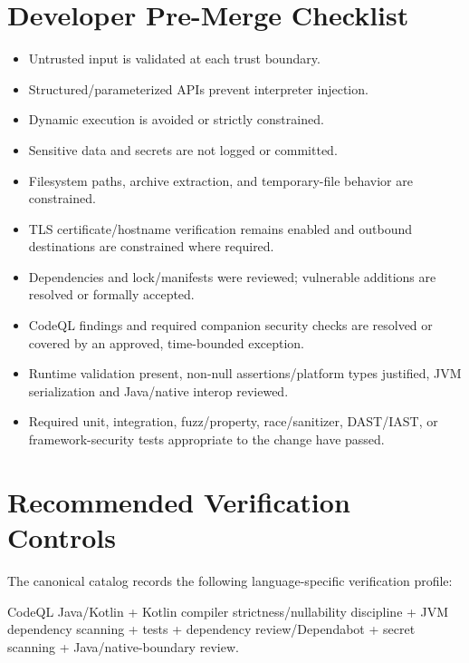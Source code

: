 \documentclass[10pt,letterpaper]{article}
\begin{document}
\section{Developer Pre-Merge Checklist}
\begin{itemize}[leftmargin=*,itemsep=2pt]
\item Untrusted input is validated at each trust boundary.
\item Structured/parameterized APIs prevent interpreter injection.
\item Dynamic execution is avoided or strictly constrained.
\item Sensitive data and secrets are not logged or committed.
\item Filesystem paths, archive extraction, and temporary-file behavior are constrained.
\item TLS certificate/hostname verification remains enabled and outbound destinations are constrained where required.
\item Dependencies and lock/manifests were reviewed; vulnerable additions are resolved or formally accepted.
\item CodeQL findings and required companion security checks are resolved or covered by an approved, time-bounded exception.
\item Runtime validation present, non-null assertions/platform types justified, JVM serialization and Java/native interop reviewed.
\item Required unit, integration, fuzz/property, race/sanitizer, DAST/IAST, or framework-security tests appropriate to the change have passed.
\end{itemize}

\section{Recommended Verification Controls}
The canonical catalog records the following language-specific verification profile:

CodeQL Java/Kotlin + Kotlin compiler strictness/nullability discipline + JVM dependency scanning + tests + dependency review/Dependabot + secret scanning + Java/native-boundary review.
\end{document}
